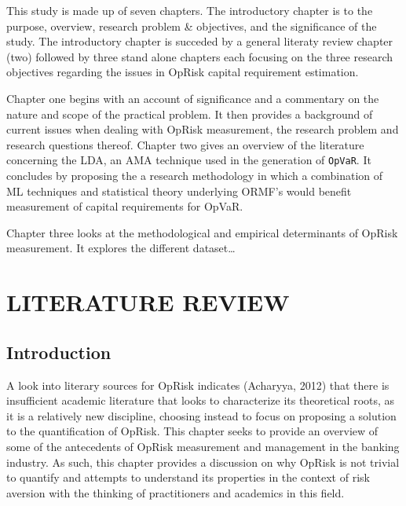 \documentclass{DissertateUSU}
\begin{document}
This study is made up of seven chapters. The introductory chapter is to
the purpose, overview, research problem \& objectives, and the
significance of the study. The introductory chapter is succeded by a
general literaty review chapter (two) followed by three stand alone
chapters each focusing on the three research objectives regarding the
issues in OpRisk capital requirement estimation.\medskip

Chapter one begins with an account of significance and a commentary on
the nature and scope of the practical problem. It then provides a
background of current issues when dealing with OpRisk measurement, the
research problem and research questions thereof. Chapter two gives an
overview of the literature concerning the LDA, an AMA technique used in
the generation of \texttt{OpVaR}. It concludes by proposing the a
research methodology in which a combination of ML techniques and
statistical theory underlying ORMF's would benefit measurement of
capital requirements for OpVaR.\medskip

Chapter three looks at the methodological and empirical determinants of
OpRisk measurement. It explores the different dataset\ldots{}

\FloatBarrier
\newpage
{}
\fancyhead[R]{\thepage}
\fancyfoot[C]{}

\chapter{LITERATURE REVIEW}
\label{LITERATURE REVIEW}

\doublespacing

\section{Introduction}
\label{sec2:Introduction}

A look into literary sources for OpRisk indicates (Acharyya, 2012) that
there is insufficient academic literature that looks to characterize its
theoretical roots, as it is a relatively new discipline, choosing
instead to focus on proposing a solution to the quantification of
OpRisk. This chapter seeks to provide an overview of some of the
antecedents of OpRisk measurement and management in the banking
industry. As such, this chapter provides a discussion on why OpRisk is
not trivial to quantify and attempts to understand its properties in the
context of risk aversion with the thinking of practitioners and
academics in this field.\medskip
\end{document}
